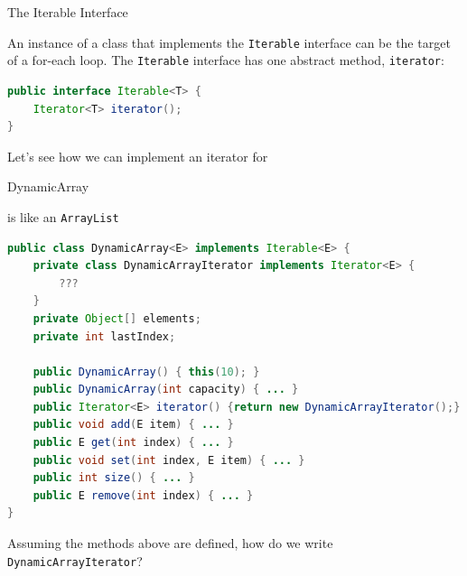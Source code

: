 \documentclass{beamer}
\begin{document}
\begin{frame}[fragile]{The Iterable Interface}

An instance of a class that implements the {\tt Iterable} interface can be the target of a for-each loop.  The {\tt Iterable} interface has one abstract method, {\tt iterator}:

\begin{lstlisting}[language=Java]
public interface Iterable<T> {
    Iterator<T> iterator();
}
\end{lstlisting}

Let's see how we can implement an iterator for 

\end{frame}

\begin{frame}[fragile]{DynamicArray}

 is like an {\tt ArrayList}

\begin{lstlisting}[language=Java]
public class DynamicArray<E> implements Iterable<E> {
    private class DynamicArrayIterator implements Iterator<E> {
        ???
    }
    private Object[] elements;
    private int lastIndex;

    public DynamicArray() { this(10); }
    public DynamicArray(int capacity) { ... }
    public Iterator<E> iterator() {return new DynamicArrayIterator();}
    public void add(E item) { ... }
    public E get(int index) { ... }
    public void set(int index, E item) { ... }
    public int size() { ... }
    public E remove(int index) { ... }
}
\end{lstlisting}

Assuming the methods above are defined, how do we write {\tt DynamicArrayIterator}?

\end{frame}
\end{document}

